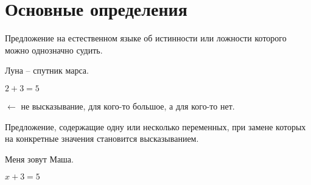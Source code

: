 \section{Основные определения}

\begin{definition}[Высказывание]
	Предложение на естественном языке об истинности или ложности которого можно однозначно судить.
\end{definition}

\begin{example}
	Луна -- спутник марса.
\end{example}

\begin{example}
	$2 + 3 = 5$
\end{example}

\begin{example}
	 $\leftarrow$ не высказывание, для кого-то большое, а для кого-то нет.
\end{example}

\begin{definition}[Предикат]
	Предложение, содержащие одну или несколько переменных, при замене которых на конкретные значения становится высказыванием.
\end{definition}

\begin{example}
	Меня зовут Маша.
\end{example}

\begin{example}
	$x + 3 = 5$
\end{example}
